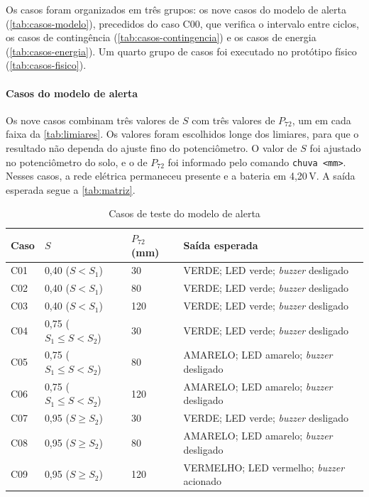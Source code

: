 Os casos foram organizados em três grupos: os nove casos do modelo de
alerta (\autoref{tab:casos-modelo}), precedidos do caso C00, que
verifica o intervalo entre ciclos, os casos de contingência
(\autoref{tab:casos-contingencia}) e os casos de energia
(\autoref{tab:casos-energia}). Um quarto grupo de casos foi executado no
protótipo físico (\autoref{tab:casos-fisico}).

\paragraph*{Casos do modelo de alerta}

Os nove casos combinam três valores de $S$ com três valores de $P_{72}$,
um em cada faixa da \autoref{tab:limiares}. Os valores foram escolhidos
longe dos limiares, para que o resultado não dependa do ajuste fino do
potenciômetro.
O valor de $S$ foi ajustado no potenciômetro do solo, e o de $P_{72}$ foi
informado pelo comando \texttt{chuva <mm>}. Nesses casos, a rede elétrica
permaneceu presente e a bateria em 4,20\,V. A saída esperada segue a
\autoref{tab:matriz}.

\begin{table}[H]
\centering
\caption{Casos de teste do modelo de alerta}
\label{tab:casos-modelo}
\small
\begin{tabular}{p{1.0cm}p{3.5cm}p{1.5cm}p{8.4cm}}
\hline
\textbf{Caso} & \textbf{$S$} & \textbf{$P_{72}$ (mm)} & \textbf{Saída esperada} \\
\hline
C01 & 0,40 ($S < S_1$) & 30 & VERDE; LED verde; \textit{buzzer} desligado \\
C02 & 0,40 ($S < S_1$) & 80 & VERDE; LED verde; \textit{buzzer} desligado \\
C03 & 0,40 ($S < S_1$) & 120 & VERDE; LED verde; \textit{buzzer} desligado \\
C04 & 0,75 ($S_1 \leq S < S_2$) & 30 & VERDE; LED verde; \textit{buzzer} desligado \\
C05 & 0,75 ($S_1 \leq S < S_2$) & 80 & AMARELO; LED amarelo; \textit{buzzer} desligado \\
C06 & 0,75 ($S_1 \leq S < S_2$) & 120 & AMARELO; LED amarelo; \textit{buzzer} desligado \\
C07 & 0,95 ($S \geq S_2$) & 30 & VERDE; LED verde; \textit{buzzer} desligado \\
C08 & 0,95 ($S \geq S_2$) & 80 & AMARELO; LED amarelo; \textit{buzzer} desligado \\
C09 & 0,95 ($S \geq S_2$) & 120 & VERMELHO; LED vermelho; \textit{buzzer} acionado \\
\hline
\end{tabular}
\end{table}

